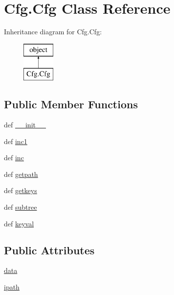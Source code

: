 \hypertarget{classCfg_1_1Cfg}{\section{Cfg.\-Cfg Class Reference}
\label{classCfg_1_1Cfg}
}
Inheritance diagram for Cfg.\-Cfg\-:\begin{figure}[H]
\begin{center}
\leavevmode
\includegraphics[height=2.000000cm]{classCfg_1_1Cfg}
\end{center}
\end{figure}
\subsection*{Public Member Functions}
\begin{DoxyCompactItemize}
\item 
def \hyperlink{classCfg_1_1Cfg_a2acaa0255752cdb04e3f69eff00f1381}{\-\_\-\-\_\-init\-\_\-\-\_\-}
\item 
def \hyperlink{classCfg_1_1Cfg_af9a1969ce93bfe8aa543a4b2a8626df1}{inc1}
\item 
def \hyperlink{classCfg_1_1Cfg_a043ba68c543f919f60beb34d752b7751}{inc}
\item 
def \hyperlink{classCfg_1_1Cfg_abb2fc147041866023b7f622196c16097}{getpath}
\item 
def \hyperlink{classCfg_1_1Cfg_afd2584b0327befb9f2988beecdb0726a}{getkeys}
\item 
def \hyperlink{classCfg_1_1Cfg_a5363b11ef74508fdbe33af91b70f128f}{subtree}
\item 
def \hyperlink{classCfg_1_1Cfg_a3c3e8b599dcc3db2424996cb5ab38216}{keyval}
\end{DoxyCompactItemize}
\subsection*{Public Attributes}
\begin{DoxyCompactItemize}
\item 
\hyperlink{classCfg_1_1Cfg_a150a4ddf8a1f91351f7600142fa71a28}{data}
\item 
\hyperlink{classCfg_1_1Cfg_a8f506e4846d887e584fffb80a3f12e11}{ipath}
\end{DoxyCompactItemize}
